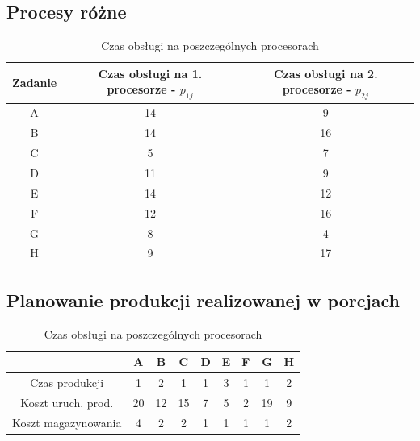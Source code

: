 \documentclass[
    12pt, %
]{../fphw}
\begin{document}
\subsection{Procesy różne}
\begin{table}[H]
    \centering
    \begin{tabular}{| c | c | c |}
        \hline
        Zadanie & Czas obsługi na 1. procesorze - \(p_{1j}\) & Czas obsługi na 2. procesorze - \(p_{2j}\) \\
        \hline
        A       & 14                                         & 9                                          \\
        B       & 14                                         & 16                                         \\
        C       & 5                                          & 7                                          \\
        D       & 11                                         & 9                                          \\
        E       & 14                                         & 12                                         \\
        F       & 12                                         & 16                                         \\
        G       & 8                                          & 4                                          \\
        H       & 9                                          & 17                                         \\
        \hline
    \end{tabular}
    \caption{Czas obsługi na poszczególnych procesorach}
\end{table}

\subsection{Planowanie produkcji realizowanej w porcjach}
\begin{table}[H]
    \centering
    \begin{tabular}{| c | c | c | c | c | c | c | c | c |}
        \hline
                            & A  & B  & C  & D & E & F & G  & H \\
        \hline
        Czas produkcji      & 1  & 2  & 1  & 1 & 3 & 1 & 1  & 2 \\
        Koszt uruch. prod.  & 20 & 12 & 15 & 7 & 5 & 2 & 19 & 9 \\
        Koszt magazynowania & 4  & 2  & 2  & 1 & 1 & 1 & 1  & 2 \\
        \hline
    \end{tabular}
    \caption{Czas obsługi na poszczególnych procesorach}
\end{table}
\end{document}
